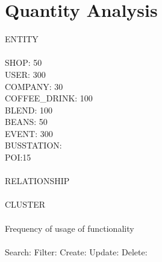\section{Quantity Analysis}
ENTITY\\\\
SHOP: 50\\ 
USER: 300\\
COMPANY: 30\\
COFFEE_DRINK: 100\\
BLEND: 100\\
BEANS: 50\\
EVENT: 300\\
BUSSTATION:\\
POI:15\\\\
RELATIONSHIP\\\\


CLUSTER\\\\



Frequency of usage of functionality\\\\
Search: 
Filter:
Create:
Update:
Delete:
